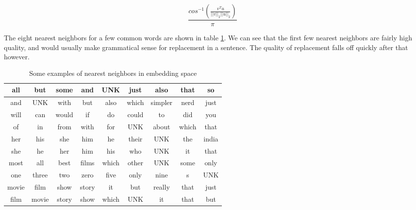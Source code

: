 $$ \frac{cos^{-1}\left(\frac{v^Tu}{||v||_2||u||_2}\right)}{\pi}$$

\noindent
The eight nearest neighbors for a few common words are shown in table \ref{tab:nearest_words}.  We can see that the first few nearest neighbors are fairly high quality, and would usually make grammatical sense for replacement in a sentence.  The quality of replacement falls off quickly after that however.

\begin{table}[h]
\centering
\begin{tabular}{ | c |  c  c  c  c  c  c  c  c | }
    \hline
    all & but& some& and& UNK& just& also& that& so \\ \hline
    and & UNK& with& but& also& which& simpler& nerd& just \\ \hline
    will & can& would& if& do& could& to& did& you \\ \hline
    of & in& from& with& for& UNK& about& which& that \\ \hline
    her & his& she& him& he& their& UNK& the& india \\ \hline
    she & he& her& him& his& who& UNK& it& that \\ \hline
    most & all& best& films& which& other& UNK& some& only \\ \hline
    one & three& two& zero& five& only& nine& s& UNK \\ \hline
    movie & film& show& story& it& but& really& that& just \\ \hline 
    film & movie& story& show& which& UNK& it& that& but \\ \hline
\end{tabular}
\caption{Some examples of nearest neighbors in embedding space}
\label{tab:nearest_words}
\end{table}
